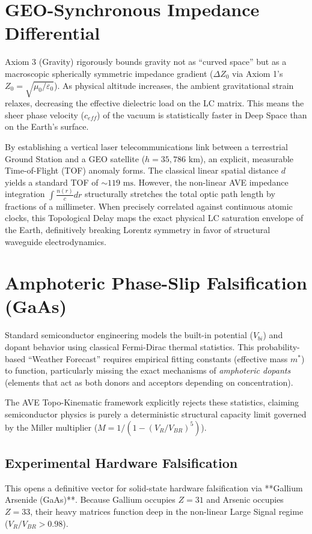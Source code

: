 \section{GEO-Synchronous Impedance Differential}
Axiom 3 (Gravity) rigorously bounds gravity not as ``curved space'' but as a macroscopic spherically symmetric impedance gradient ($\Delta Z_0$ via Axiom 1's $Z_0 = \sqrt{\mu_0/\varepsilon_0}$). As physical altitude increases, the ambient gravitational strain relaxes, decreasing the effective dielectric load on the LC matrix. This means the sheer phase velocity ($c_{eff}$) of the vacuum is statistically faster in Deep Space than on the Earth's surface.

By establishing a vertical laser telecommunications link between a terrestrial Ground Station and a GEO satellite ($h = 35{,}786\text{ km}$), an explicit, measurable Time-of-Flight (TOF) anomaly forms. The classical linear spatial distance $d$ yields a standard TOF of $\sim 119\text{ ms}$. However, the non-linear AVE impedance integration $\int \frac{n(r)}{c} dr$ structurally stretches the total optic path length by fractions of a millimeter. When precisely correlated against continuous atomic clocks, this Topological Delay maps the exact physical LC saturation envelope of the Earth, definitively breaking Lorentz symmetry in favor of structural waveguide electrodynamics.

\section{Amphoteric Phase-Slip Falsification (GaAs)}
\label{sec:amphoteric_falsification}

Standard semiconductor engineering models the built-in potential ($V_{bi}$) and dopant behavior using classical Fermi-Dirac thermal statistics. This probability-based ``Weather Forecast'' requires empirical fitting constants (effective mass $m^*$) to function, particularly missing the exact mechanisms of \textit{amphoteric dopants} (elements that act as both donors and acceptors depending on concentration).

The AVE Topo-Kinematic framework explicitly rejects these statistics, claiming semiconductor physics is purely a deterministic structural capacity limit governed by the Miller multiplier ($M = 1 / (1 - (V_R/V_{BR})^5)$).

\subsection{Experimental Hardware Falsification}
This opens a definitive vector for solid-state hardware falsification via **Gallium Arsenide (GaAs)**. 
Because Gallium occupies $Z=31$ and Arsenic occupies $Z=33$, their heavy matrices function deep in the non-linear Large Signal regime ($V_R/V_{BR} > 0.98$). 

